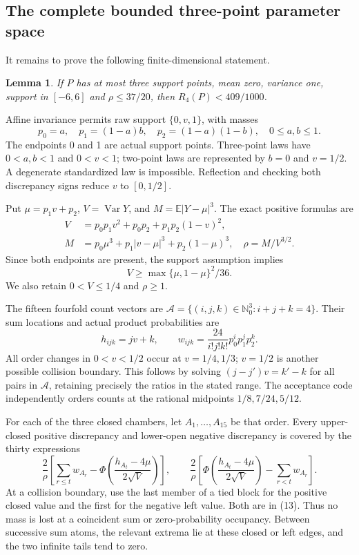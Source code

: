 \documentclass[11pt,a4paper]{article}
\numberwithin{equation}{section}
\newtheorem{lemma}[theorem]{Lemma}
\theoremstyle{definition}
\theoremstyle{remark}
\newcommand{\E}{\mathbb E}
\begin{document}
\subsection{The complete bounded three-point parameter space}
It remains to prove the following finite-dimensional statement.
\begin{lemma}\label{n4:lem:bounded}
If $P$ has at most three support points, mean zero, variance one,
support in $[-6,6]$ and $\rho\le37/20$, then $R_4(P)<409/1000$.
\end{lemma}
Affine invariance permits raw support $\{0,v,1\}$, with masses
\[
 p_0=a,\quad p_1=(1-a)b,\quad p_2=(1-a)(1-b),\quad
                         0\le a,b\le1.\tag{8}
\]
The endpoints 0 and 1 are actual support points. Three-point laws have
$0<a,b<1$ and $0<v<1$; two-point laws are represented by $b=0$ and
$v=1/2$. A degenerate standardized law is impossible. Reflection and
checking both discrepancy signs reduce $v$ to $[0,1/2]$.

Put $\mu=p_1v+p_2$, $V=\operatorname{Var}Y$, and $M=\E|Y-\mu|^3$.
The exact positive formulas are
\begin{align}
 V&=p_0p_1v^2+p_0p_2+p_1p_2(1-v)^2,\tag{9}\\
 M&=p_0\mu^3+p_1|v-\mu|^3+p_2(1-\mu)^3,\quad
 \rho=M/V^{3/2}.\tag{10}
\end{align}
Since both endpoints are present, the support assumption implies
\[
                  V\ge\max\{\mu,1-\mu\}^2/36.\tag{11}
\]
We also retain $0<V\le1/4$ and $\rho\ge1$.

The fifteen fourfold count vectors are
$\mathcal A=\{(i,j,k)\in\mathbb N_0^3:i+j+k=4\}$.
Their sum locations and actual product probabilities are
\[
 h_{ijk}=jv+k,\qquad
 w_{ijk}=\frac{24}{i!j!k!}p_0^ip_1^jp_2^k.\tag{12}
\]
All order changes in $0<v<1/2$ occur at $v=1/4,1/3$; $v=1/2$
is another possible collision boundary. This follows by solving
$(j-j')v=k'-k$ for all pairs in $\mathcal A$, retaining precisely
the ratios in the stated range. The acceptance code independently
orders counts at the rational midpoints $1/8,7/24,5/12$.

For each of the three closed chambers, let $A_1,\ldots,A_{15}$ be that
order. Every upper-closed positive discrepancy and lower-open negative
discrepancy is covered by the thirty expressions
\[
 \frac2\rho\left[\sum_{r\le t}w_{A_r}-
     \Phi\left(\frac{h_{A_t}-4\mu}{2\sqrt V}\right)\right],\qquad
 \frac2\rho\left[\Phi\left(\frac{h_{A_t}-4\mu}{2\sqrt V}\right)
                       -\sum_{r<t}w_{A_r}\right].\tag{13}
\]
At a collision boundary, use the last member of a tied block for the
positive closed value and the first for the negative left value. Both
are in (13). Thus no mass is lost at a coincident sum or zero-probability
occupancy. Between successive sum atoms, the relevant extrema lie at
these closed or left edges, and the two infinite tails tend to zero.
\end{document}
